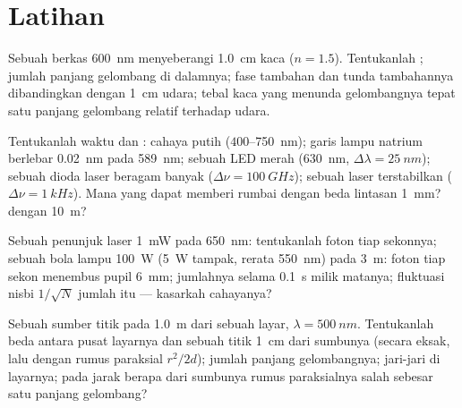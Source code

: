 \section{Latihan}

\begin{exercise}[$\star$]\label{exo:b2:scalar-light-model:1}
Sebuah berkas \qty{600}{nm} menyeberangi \qty{1.0}{cm} kaca ($n = 1.5$). Tentukanlah ; jumlah panjang gelombang di dalamnya; fase tambahan dan tunda tambahannya
dibandingkan dengan \qty{1}{cm} udara; tebal kaca yang menunda
gelombangnya tepat satu panjang gelombang relatif terhadap udara.
\end{exercise}

\begin{exercise}[$\star$]\label{exo:b2:scalar-light-model:2}
Tentukanlah waktu dan : cahaya putih ($400$--\qty{750}{nm}); garis lampu
natrium berlebar \qty{0.02}{nm} pada \qty{589}{nm}; sebuah LED merah (\qty{630}{nm},
$\Delta\lambda = \qty{25}{nm}$); sebuah dioda laser beragam banyak ($\Delta\nu = \qty{100}{GHz}$); sebuah
laser terstabilkan ($\Delta\nu = \qty{1}{kHz}$). Mana yang dapat memberi rumbai dengan
beda lintasan \qty{1}{mm}? dengan \qty{10}{m}?
\end{exercise}

\begin{exercise}[$\star$]\label{exo:b2:scalar-light-model:3}
Sebuah penunjuk laser \qty{1}{mW} pada \qty{650}{nm}: tentukanlah foton tiap sekonnya; sebuah
bola lampu \qty{100}{W} (\qty{5}{W} tampak, rerata \qty{550}{nm}) pada \qty{3}{m}: foton tiap
sekon menembus pupil \qty{6}{mm}; jumlahnya selama \qty{0.1}{s} milik matanya;
fluktuasi nisbi $1/\sqrt N$ jumlah itu --- kasarkah cahayanya?
\end{exercise}

\begin{exercise}[$\star$]\label{exo:b2:scalar-light-model:4}
Sebuah sumber titik pada \qty{1.0}{m} dari sebuah layar, $\lambda = \qty{500}{nm}$. Tentukanlah beda
 antara pusat layarnya dan sebuah titik \qty{1}{cm}
dari sumbunya (secara eksak, lalu dengan rumus paraksial $r^2/2d$); jumlah
panjang gelombangnya; jari-jari  di layarnya; pada jarak berapa dari sumbunya
rumus paraksialnya salah sebesar satu panjang gelombang?
\end{exercise}

